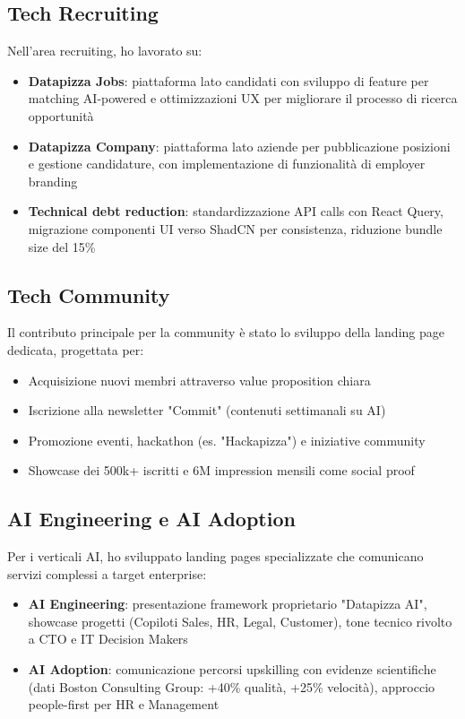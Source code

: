 \subsection{Tech Recruiting}
Nell'area recruiting, ho lavorato su:
\begin{itemize}
  \item \textbf{Datapizza Jobs}: piattaforma lato candidati con sviluppo di feature per matching AI-powered e ottimizzazioni UX per migliorare il processo di ricerca opportunità
  \item \textbf{Datapizza Company}: piattaforma lato aziende per pubblicazione posizioni e gestione candidature, con implementazione di funzionalità di employer branding
  \item \textbf{Technical debt reduction}: standardizzazione API calls con React Query, migrazione componenti UI verso ShadCN per consistenza, riduzione bundle size del 15\%
\end{itemize}

\subsection{Tech Community}
Il contributo principale per la community è stato lo sviluppo della landing page dedicata, progettata per:
\begin{itemize}
  \item Acquisizione nuovi membri attraverso value proposition chiara
  \item Iscrizione alla newsletter "Commit" (contenuti settimanali su AI)
  \item Promozione eventi, hackathon (es. "Hackapizza") e iniziative community
  \item Showcase dei 500k+ iscritti e 6M impression mensili come social proof
\end{itemize}

\subsection{AI Engineering e AI Adoption}
Per i verticali AI, ho sviluppato landing pages specializzate che comunicano servizi complessi a target enterprise:
\begin{itemize}
  \item \textbf{AI Engineering}: presentazione framework proprietario "Datapizza AI", showcase progetti (Copiloti Sales, HR, Legal, Customer), tone tecnico rivolto a CTO e IT Decision Makers
  \item \textbf{AI Adoption}: comunicazione percorsi upskilling con evidenze scientifiche (dati Boston Consulting Group: +40\% qualità, +25\% velocità), approccio people-first per HR e Management
\end{itemize}


